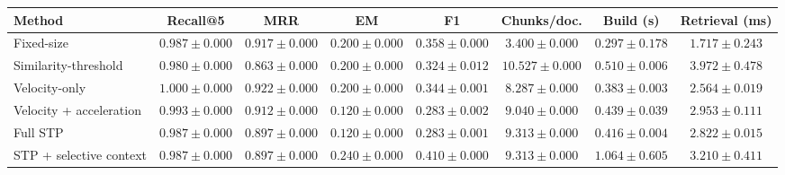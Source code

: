 \begin{tabular*}{\textwidth}{@{\extracolsep{\fill}}lccccccc@{}}
\toprule
Method & Recall@5 & MRR & EM & F1 & Chunks/doc. & Build (s) & Retrieval (ms) \\
\midrule
Fixed-size & $0.987\pm0.000$ & $0.917\pm0.000$ & $0.200\pm0.000$ & $0.358\pm0.000$ & $3.400\pm0.000$ & $0.297\pm0.178$ & $1.717\pm0.243$ \\
Similarity-threshold & $0.980\pm0.000$ & $0.863\pm0.000$ & $0.200\pm0.000$ & $0.324\pm0.012$ & $10.527\pm0.000$ & $0.510\pm0.006$ & $3.972\pm0.478$ \\
Velocity-only & $\mathbf{1.000\pm0.000}$ & $\mathbf{0.922\pm0.000}$ & $0.200\pm0.000$ & $0.344\pm0.001$ & $8.287\pm0.000$ & $0.383\pm0.003$ & $2.564\pm0.019$ \\
Velocity + acceleration & $0.993\pm0.000$ & $0.912\pm0.000$ & $0.120\pm0.000$ & $0.283\pm0.002$ & $9.040\pm0.000$ & $0.439\pm0.039$ & $2.953\pm0.111$ \\
Full STP & $0.987\pm0.000$ & $0.897\pm0.000$ & $0.120\pm0.000$ & $0.283\pm0.001$ & $9.313\pm0.000$ & $0.416\pm0.004$ & $2.822\pm0.015$ \\
STP + selective context & $0.987\pm0.000$ & $0.897\pm0.000$ & $\mathbf{0.240\pm0.000}$ & $\mathbf{0.410\pm0.000}$ & $9.313\pm0.000$ & $1.064\pm0.605$ & $3.210\pm0.411$ \\
\bottomrule
\end{tabular*}